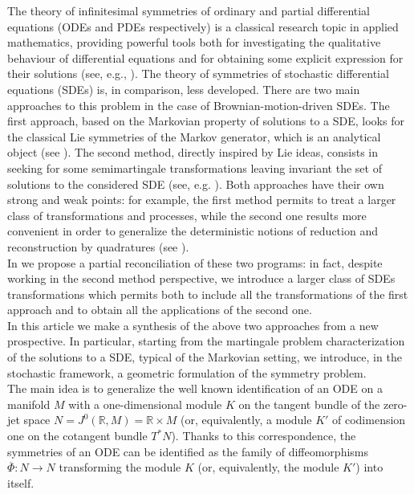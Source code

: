 \documentclass{article}[10pt]
\begin{document}
The theory of infinitesimal symmetries of ordinary and partial differential equations (ODEs and PDEs respectively)  is a classical research
topic in applied mathematics, providing powerful tools both for investigating the qualitative behaviour of  differential equations and for
obtaining  some explicit expression for their solutions (see, e.g., \cite{Olver1993,Stephani1989}). The theory of symmetries of stochastic
differential equations (SDEs) is, in comparison, less developed. There are two main approaches to this problem in the case of
Brownian-motion-driven SDEs. The first approach, based on the Markovian property of solutions to a SDE, looks for the classical Lie symmetries
of the Markov generator, which is an analytical  object (see \cite{DeLara1995,Glover1990,Liao1992}). The second method, directly inspired by Lie
ideas, consists in seeking for some semimartingale transformations   leaving invariant the set of   solutions to the considered SDE (see,
e.g. \cite{Fredericks2007,Gaeta1999,Kozlov2010,Zambrini2004,Srihirun2007,Unal2004}). Both approaches have their own strong and weak points: for
example, the first method permits to treat a larger class of transformations and processes, while  the second one results more convenient in
order
to generalize the deterministic notions of reduction and reconstruction by quadratures (see \cite{DMU2,Cami2009}).\\
In \cite{DMU1} we propose a partial reconciliation of these two programs: in fact, despite working in the second method perspective,  we introduce
a larger class of SDEs transformations which permits both to include all the transformations of the first approach and to obtain all the applications
of the second one.\\
In this article we make a synthesis of the above two approaches from a new prospective. In particular, starting from  the martingale problem
characterization of the
solutions to a SDE, typical of the Markovian setting, we introduce, in the stochastic framework, a geometric formulation of the  symmetry problem. \\
The main idea is to generalize the  well known identification of an ODE on a manifold $M$ with a one-dimensional module $K$ on the tangent bundle of the
zero-jet
space $N=J^0(\mathbb{R},M)=\mathbb{R} \times M$ (or, equivalently,  a
module $K'$ of codimension one on the cotangent bundle $T^*N$). Thanks to this correspondence, the symmetries of an ODE can be identified
 as the family
of diffeomorphisms $\overline{\Phi}:N
\rightarrow N$ transforming the module $K$ (or, equivalently, the module $K'$) into itself. \\
\end{document}
